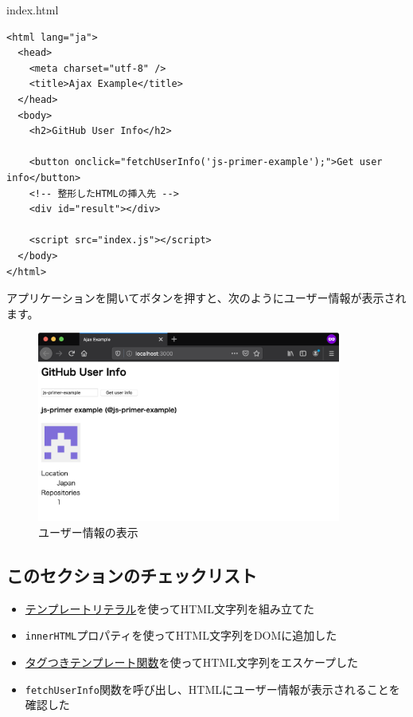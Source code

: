 \begin{listtitle}
index.html
\end{listtitle}
\begin{lstlisting}
<html lang="ja">
  <head>
    <meta charset="utf-8" />
    <title>Ajax Example</title>
  </head>
  <body>
    <h2>GitHub User Info</h2>

    <button onclick="fetchUserInfo('js-primer-example');">Get user info</button>
    <!-- 整形したHTMLの挿入先 -->
    <div id="result"></div>

    <script src="index.js"></script>
  </body>
</html>
\end{lstlisting}
\listend

アプリケーションを開いてボタンを押すと、次のようにユーザー情報が表示されます。

\begin{figure}[h]
\centering
\includegraphics[width=100mm]{fig/fig-4.png}
\caption{ユーザー情報の表示}
\end{figure}

\hypertarget{section-checklist}{%
\subsection{このセクションのチェックリスト}\label{section-checklist}}

\begin{itemize}
\item
  \hyperlink{create}{テンプレートリテラル}を使ってHTML文字列を組み立てた
\item
  \texttt{innerHTML}プロパティを使ってHTML文字列をDOMに追加した
\item
  \hyperlink{tagged-template-function}{タグつきテンプレート関数}を使ってHTML文字列をエスケープした
\item
  \texttt{fetchUserInfo}関数を呼び出し、HTMLにユーザー情報が表示されることを確認した
\end{itemize}

